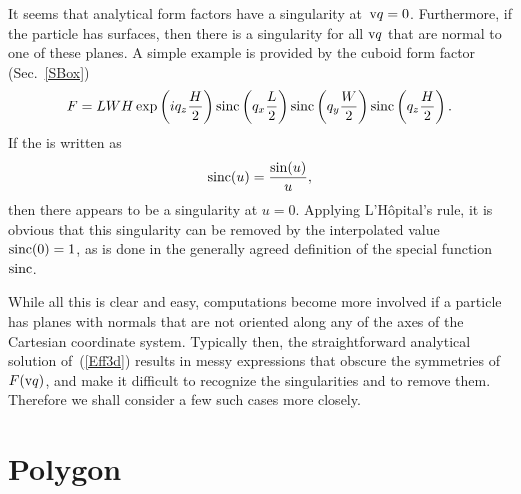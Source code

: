 %
It seems that  analytical form factors have a singularity at~$\text{v}{q}=0$.
Furthermore, if the particle has  surfaces,
then there is a singularity for all $\text{v}{q}$ that are normal to one of these planes.
A simple example is provided by the cuboid form factor (Sec.~\ref{SBox})
\begin{equation}
F= L W H\exp\left(i q_z \frac{H}{2}\right) \operatorname{sinc}\left(q_x \frac{L}{2}\right)
\operatorname{sinc}\left(q_y \frac{W}{2}\right) \operatorname{sinc}\left(q_z \frac{H}{2}\right).
\end{equation}
If the  is written as
\begin{equation}
  \operatorname{sinc}(u) = \frac{\sin(u)}{u},
\end{equation}
then there appears to be a singularity at $u=0$.
Applying L'H\^opital's rule, it is obvious
that this singularity can be removed by the interpolated value
$\operatorname{sinc}(0)=1$,
as is done in the generally agreed definition of the special function~$\operatorname{sinc}$.

While all this is clear and easy,
computations become more involved
if a particle has planes with normals that are not oriented along
any of the axes of the Cartesian coordinate system.
Typically then, the straightforward analytical solution of~(\ref{Eff3d})
results in messy expressions that obscure the symmetries of~$F(\text{v}{q})$,
and make it difficult to recognize the singularities and
to remove them.
Therefore we shall consider a few such cases more closely.


\section{Polygon}\label{SFFPolygon}

%
\def\R{\v{R}}
\def\E{\v{E}}
\def\x{\v{x}}
\def\V{\v{V}}
\def\qp{\v{p}}
\def\n{\v{\hat n}}
\def\uqp{\v{\hat p}}

